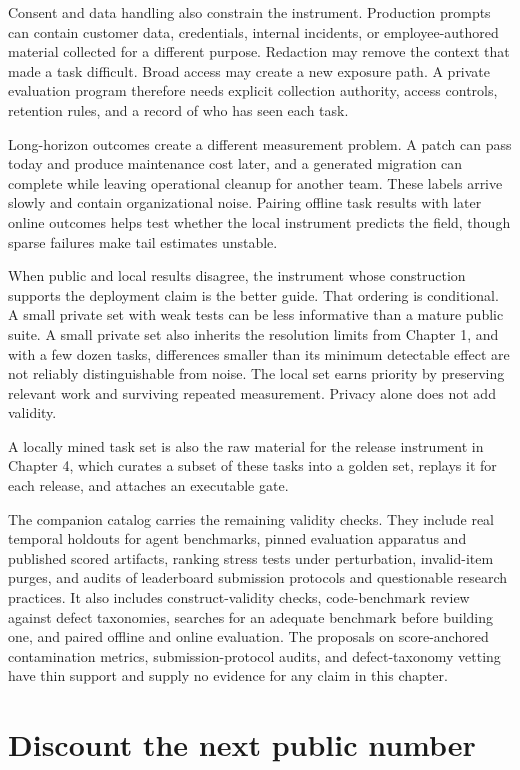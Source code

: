 Consent and data handling also constrain the instrument. Production prompts can contain customer data, credentials, internal incidents, or employee-authored material collected for a different purpose. Redaction may remove the context that made a task difficult. Broad access may create a new exposure path. A private evaluation program therefore needs explicit collection authority, access controls, retention rules, and a record of who has seen each task.

Long-horizon outcomes create a different measurement problem. A patch can pass today and produce maintenance cost later, and a generated migration can complete while leaving operational cleanup for another team. These labels arrive slowly and contain organizational noise. Pairing offline task results with later online outcomes helps test whether the local instrument predicts the field, though sparse failures make tail estimates unstable.

When public and local results disagree, the instrument whose construction supports the deployment claim is the better guide. That ordering is conditional. A small private set with weak tests can be less informative than a mature public suite. A small private set also inherits the resolution limits from Chapter 1, and with a few dozen tasks, differences smaller than its minimum detectable effect are not reliably distinguishable from noise. The local set earns priority by preserving relevant work and surviving repeated measurement. Privacy alone does not add validity.

A locally mined task set is also the raw material for the release instrument in Chapter 4, which curates a subset of these tasks into a golden set, replays it for each release, and attaches an executable gate.

The companion catalog carries the remaining validity checks. They include real temporal holdouts for agent benchmarks, pinned evaluation apparatus and published scored artifacts, ranking stress tests under perturbation, invalid-item purges, and audits of leaderboard submission protocols and questionable research practices. It also includes construct-validity checks, code-benchmark review against defect taxonomies, searches for an adequate benchmark before building one, and paired offline and online evaluation. The proposals on score-anchored contamination metrics, submission-protocol audits, and defect-taxonomy vetting have thin support and supply no evidence for any claim in this chapter.

\section{Discount the next public number}\label{discount-the-next-public-number}

